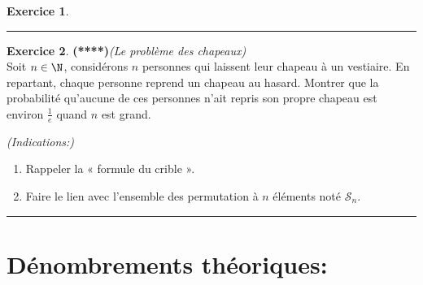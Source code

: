 \documentclass[a4paper,11pt]{article}
\theoremstyle{definition}
\newtheorem{exo}{Exercice} %
\begin{document}
\begin{minipage}{1\linewidth}
\begin{minipage}[t]{0.48\linewidth}
\begin{exo}
\centering\rule{1\linewidth}{0.6pt}\end{exo}


\begin{exo}\textbf{(****)}\quad\textit{(Le problème des chapeaux)}\\[0.2cm]
Soit $n\in\N$, considérons $n$ personnes qui laissent leur chapeau à un vestiaire. En repartant, chaque personne reprend un chapeau au hasard. Montrer que la probabilité qu'aucune de ces personnes n'ait repris son propre chapeau est environ $\frac{1}{e}$ quand $n$ est grand.

\textit{(Indications:)}
\begin{enumerate}
	\item Rappeler la « formule du crible ». 
	\item Faire le lien avec l'ensemble des permutation à $n$ éléments noté $\mathcal S_n$. 
	
\end{enumerate}

\centering\rule{1\linewidth}{0.6pt}\end{exo}


\end{minipage}\end{minipage} 

\section*{Dénombrements théoriques:}\hfill\\%
\end{document}
